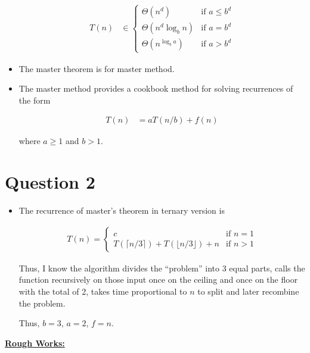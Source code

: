 \documentclass[12pt]{article}
\begin{document}
\begin{itemize}
    \begin{align}
        T(n) &\in \begin{cases}
        \Theta(n^d) & \text{if $a \leq b^d$}\\
        \Theta(n^d\log_b n) & \text{if $a = b^d$}\\
        \Theta(n^{\log_b a}) & \text{if $a > b^d$}
        \end{cases}
    \end{align}

    \item The master theorem is for master method.
    \item The master method provides a cookbook method for solving recurrences
    of the form

    \begin{align}
        T(n) &= aT(n/b) + f(n)
    \end{align}

    \bigskip

    where $a \geq 1$ and $b > 1$.
\end{itemize}

\bigskip

\section*{Question 2}

\bigskip

\begin{itemize}
    \item
    \setcounter{equation}{0}
    \bigskip

    The recurrence of master's theorem in ternary version is

    \begin{align}
        T(n) = \begin{cases}
        c    & \text{if $n = 1$}\\
        T(\lceil n/3 \rceil) + T(\lfloor n/3 \rfloor) + n & \text{if $n > 1$}
        \end{cases}
    \end{align}

    \bigskip

    Thus, I know the algorithm divides the ``problem'' into 3 equal parts, calls
    the function recursively on those input once on the ceiling and once on the floor with
    the total of 2, takes time proportional to $n$ to split and later recombine
    the problem.

    \bigskip

    Thus, $b = 3$, $a = 2$, $f = n$.
\end{itemize}

\bigskip

\begin{mdframed}
    \underline{\textbf{Rough Works:}}

    \bigskip


\end{mdframed}
\end{document}
